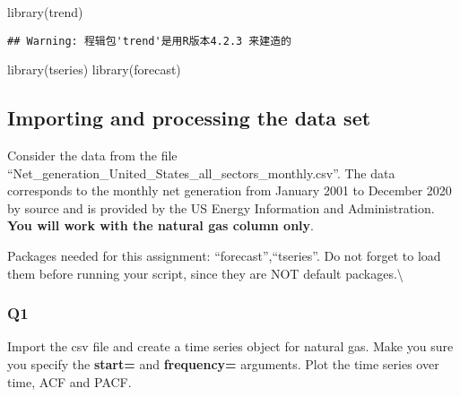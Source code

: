 \documentclass[
]{article}
\newenvironment{Shaded}{\begin{snugshade}}{\end{snugshade}}
\newcommand{\AttributeTok}[1]{\textcolor[rgb]{0.77,0.63,0.00}{#1}}
\newcommand{\ConstantTok}[1]{\textcolor[rgb]{0.00,0.00,0.00}{#1}}
\newcommand{\DecValTok}[1]{\textcolor[rgb]{0.00,0.00,0.81}{#1}}
\newcommand{\FunctionTok}[1]{\textcolor[rgb]{0.00,0.00,0.00}{#1}}
\newcommand{\NormalTok}[1]{#1}
\newcommand{\OtherTok}[1]{\textcolor[rgb]{0.56,0.35,0.01}{#1}}
\newcommand{\SpecialCharTok}[1]{\textcolor[rgb]{0.00,0.00,0.00}{#1}}
\newcommand{\StringTok}[1]{\textcolor[rgb]{0.31,0.60,0.02}{#1}}
\begin{document}
\begin{Shaded}
\begin{Highlighting}[]
\FunctionTok{library}\NormalTok{(trend)}
\end{Highlighting}
\end{Shaded}

\begin{verbatim}
## Warning: 程辑包'trend'是用R版本4.2.3 来建造的
\end{verbatim}

\begin{Shaded}
\begin{Highlighting}[]
\FunctionTok{library}\NormalTok{(tseries)}
\FunctionTok{library}\NormalTok{(forecast)}
\end{Highlighting}
\end{Shaded}

\hypertarget{importing-and-processing-the-data-set}{%
\subsection{Importing and processing the data
set}\label{importing-and-processing-the-data-set}}

Consider the data from the file
``Net\_generation\_United\_States\_all\_sectors\_monthly.csv''. The data
corresponds to the monthly net generation from January 2001 to December
2020 by source and is provided by the US Energy Information and
Administration. \textbf{You will work with the natural gas column only}.

Packages needed for this assignment: ``forecast'',``tseries''. Do not
forget to load them before running your script, since they are NOT
default packages.\textbackslash{}

\hypertarget{q1}{%
\subsubsection{Q1}\label{q1}}

Import the csv file and create a time series object for natural gas.
Make you sure you specify the \textbf{start=} and \textbf{frequency=}
arguments. Plot the time series over time, ACF and PACF.

\begin{Shaded}
\end{Shaded}
\end{document}
